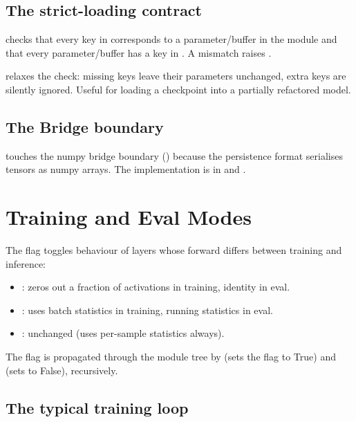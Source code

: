 \subsection{The strict-loading contract}
\label{ssec:module_system:strict_loading}

 checks that every key in
 corresponds to a parameter/buffer in the module and that
every parameter/buffer has a key in . A mismatch raises
.

 relaxes the check: missing keys leave their
parameters unchanged, extra keys are silently ignored. Useful for
loading a checkpoint into a partially refactored model.

\subsection{The Bridge boundary}
\label{ssec:module_system:bridge}

 touches the numpy bridge boundary
() because the persistence format
serialises tensors as numpy arrays. The implementation is in
 and .

\section{Training and Eval Modes}
\label{sec:module_system:train_eval}

The  flag toggles behaviour of layers whose forward
differs between training and inference:

\begin{itemize}
  \item {}: zeros out a fraction of activations in
    training, identity in eval.
  \item {}: uses batch statistics in training, running
    statistics in eval.
  \item {}: unchanged (uses per-sample statistics
    always).
\end{itemize}

The flag is propagated through the module tree by
 (sets the flag to True) and 
(sets to False), recursively.

\subsection{The typical training loop}
\label{ssec:module_system:training_loop}

